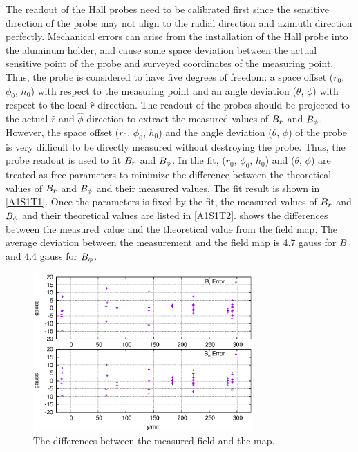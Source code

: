 The readout of the Hall probes need to be calibrated first since the sensitive direction of the probe may not align to the radial direction and azimuth direction perfectly. Mechanical errors can arise from the installation of the Hall probe into the aluminum holder, and cause some space deviation between the actual sensitive point of the probe and surveyed coordinates of the measuring point. Thus, the probe is considered to have five degrees of freedom: a space offset ($r_0$, $\phi_0$, $h_0$) with respect to the measuring point and an angle deviation ($\theta$, $\phi$) with respect to the local $\hat{r}$ direction. The readout of the probes should be projected to the actual $\hat{r}$ and $\hat{\phi}$ direction to extract the measured values of $B_r$ and $B_{\phi}$. However, the space offset ($r_0$, $\phi_0$, $h_0$) and the angle deviation ($\theta$, $\phi$) of the probe is very difficult to be directly measured without destroying the probe. Thus, the probe readout is used to fit $B_r$ and $B_{\phi}$. In the fit, ($r_0$, $\phi_0$, $h_0$) and ($\theta$, $\phi$) are treated as free parameters to minimize the difference between the theoretical values of $B_r$ and $B_{\phi}$ and their measured values. The fit result is shown in \cref{A1S1T1}. Once the parameters is fixed by the fit, the measured values of $B_r$ and $B_{\phi}$ and their theoretical values are listed in \cref{A1S1T2}.  shows the differences between the measured value and the theoretical value from the field map. The average deviation between the measurement and the field map is 4.7 gauss for $B_r$ and 4.4 gauss for $B_{\phi}$.

\begin{figure}[tb!]
  \centering
  \includegraphics[width=0.75\textwidth]{figs/target-field-mapping-error}
  \caption{The differences between the measured field and the map. \label{A1S1F2}}
\end{figure}

